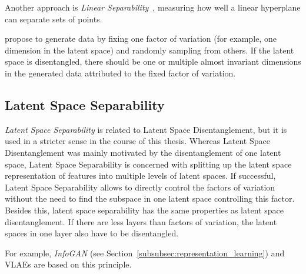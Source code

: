 Another approach is \textit{Linear Separability}~\citep{karras2019style}, measuring how well a linear hyperplane can separate sets of points.

\citet{kim2018disentangling} propose to generate data by fixing one factor of variation (for example, one dimension in the latent space) and randomly sampling from others.
If the latent space is disentangled, there should be one or multiple almost invariant dimensions in the generated data attributed to the fixed factor of variation.

\subsection{Latent Space Separability}\label{subsec:feature-separability}

\textit{Latent Space Separability} is related to Latent Space Disentanglement, but it is used in a stricter sense in the course of this thesis.
Whereas Latent Space Disentanglement was mainly motivated by the disentanglement of one latent space, Latent Space Separability is concerned with splitting up the latent space representation of features into multiple levels of latent spaces.
If successful, Latent Space Separability allows to directly control the factors of variation without the need to find the subspace in one latent space controlling this factor.
Besides this, latent space separability has the same properties as latent space disentanglement.
If there are less layers than factors of variation, the latent spaces in one layer also have to be disentangled.

For example, \textit{InfoGAN} (see Section~\ref{subsubsec:representation_learning}) and \acp{VLAE} are based on this principle.